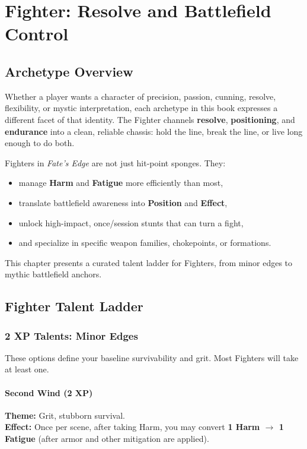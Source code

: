 \documentclass[11pt]{book}
\begin{document}
\chapter{Fighter: Resolve and Battlefield Control}

\section{Archetype Overview}

Whether a player wants a character of precision, passion, cunning, resolve, flexibility, or
mystic interpretation, each archetype in this book expresses a different facet of that identity.
The Fighter channels \textbf{resolve}, \textbf{positioning}, and \textbf{endurance} into a
clean, reliable chassis: hold the line, break the line, or live long enough to do both.

Fighters in \textit{Fate's Edge} are not just hit-point sponges. They:
\begin{itemize}
  \item manage \textbf{Harm} and \textbf{Fatigue} more efficiently than most,
  \item translate battlefield awareness into \textbf{Position} and \textbf{Effect},
  \item unlock high-impact, once/session stunts that can turn a fight,
  \item and specialize in specific weapon families, chokepoints, or formations.
\end{itemize}

This chapter presents a curated talent ladder for Fighters, from minor edges
to mythic battlefield anchors.

\section{Fighter Talent Ladder}

\subsection{2 XP Talents: Minor Edges}

These options define your baseline survivability and grit. Most Fighters will take at least one.

\subsubsection{Second Wind (2 XP)}
\textbf{Theme:} Grit, stubborn survival.\\
\textbf{Effect:} Once per scene, after taking Harm, you may convert
\textbf{1 Harm $\rightarrow$ 1 Fatigue} (after armor and other mitigation are applied).
\end{document}
